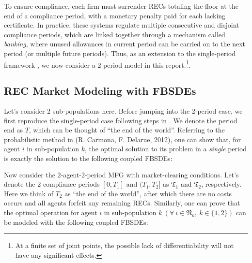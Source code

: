 \documentclass[a4paper,10pt]{article}
\newcommand{\1}{\mathbf{1}}
\begin{document}
To ensure compliance, each firm must surrender RECs totaling the floor
at the end of a compliance period, with a monetary penalty paid for each
lacking certificate. In practice, these systems regulate multiple
consecutive and disjoint compliance periods, which are linked together
through a mechanism called \emph{banking}, where unused allowances in
current period can be carried on to the next period (or multiple future
periods). Thus, as an extension to the single-period framework \cite{SC}, we
now consider a 2-period model in this report.\footnote{At a finite set
  of joint points, the possible lack of differentiability will not have
  any significant effects.}.

\subsection{REC Market Modeling with
FBSDEs}\label{rec-market-modeling}

Let's consider 2 sub-populations here. Before jumping into the 2-period
case, we first reproduce the single-period case following steps in \cite{SC}. We
denote the period end as \(T\), which can be thought of ``the end of the
world''. Referring to the probabilistic method in \cite{RC} (R. Carmona, F. Delarue,
2012), one can show that, for agent \(i\) in sub-population \(k\), the
optimal solution to its problem in a \emph{single} period is exactly the
solution to the following coupled FBSDEs:


Now consider the 2-agent-2-period MFG with market-clearing conditions.
Let's denote the 2 compliance periods \([0,T_1]\) and \((T_1,T_2]\) as
\(\mathfrak{T_1}\) and \(\mathfrak{T_2}\), respectively. Here we think
of \(T_2\) as ``the end of the world'', after which there are no costs
occurs and all agents forfeit any remaining RECs. Similarly, one can
prove that the optimal operation for agent \(i\) in sub-population
\(k~(\forall~i \in \mathfrak{N}_k,~k\in\lbrace{1,2\rbrace})\) can be
modeled with the following coupled FBSDEs:
\end{document}
